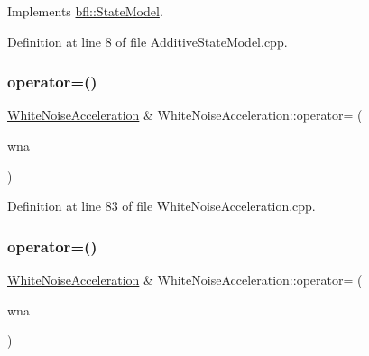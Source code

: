 Implements \mbox{\hyperlink{classbfl_1_1StateModel_a34037bc30bc07667b76b5a719a65ab82}{bfl\+::\+State\+Model}}.



Definition at line 8 of file Additive\+State\+Model.\+cpp.

\mbox{\label{classbfl_1_1WhiteNoiseAcceleration_a6f69d09499e7a4746bd823db5fc5ceec}} 
\subsubsection{\texorpdfstring{operator=()}{operator=()}\hspace{0.1cm}{\footnotesize\ttfamily [1/2]}}
{\footnotesize\ttfamily \mbox{\hyperlink{classbfl_1_1WhiteNoiseAcceleration}{White\+Noise\+Acceleration}} \& White\+Noise\+Acceleration\+::operator= (\begin{DoxyParamCaption}\item[{const \mbox{\hyperlink{classbfl_1_1WhiteNoiseAcceleration}{White\+Noise\+Acceleration}} \&}]{wna }\end{DoxyParamCaption})}



Definition at line 83 of file White\+Noise\+Acceleration.\+cpp.

\mbox{\label{classbfl_1_1WhiteNoiseAcceleration_a4562a1dfc45dd143f7d05fea98e38f42}} 
\subsubsection{\texorpdfstring{operator=()}{operator=()}\hspace{0.1cm}{\footnotesize\ttfamily [2/2]}}
{\footnotesize\ttfamily \mbox{\hyperlink{classbfl_1_1WhiteNoiseAcceleration}{White\+Noise\+Acceleration}} \& White\+Noise\+Acceleration\+::operator= (\begin{DoxyParamCaption}\item[{\mbox{\hyperlink{classbfl_1_1WhiteNoiseAcceleration}{White\+Noise\+Acceleration}} \&\&}]{wna }\end{DoxyParamCaption})\hspace{0.3cm}{\ttfamily [noexcept]}}



